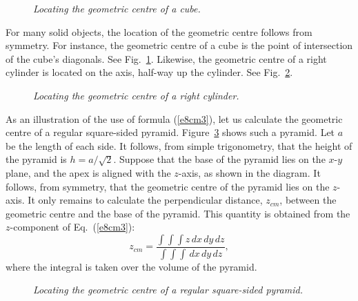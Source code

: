 \begin{figure}[h]
\epsfysize=1.5in
\centerline{}
\caption{\em Locating the geometric centre of a cube.}\label{f73}  
\end{figure}

For many solid objects, the location of the geometric centre follows from symmetry.
For instance, the geometric centre of a 
cube is the point of intersection of the cube's diagonals. See Fig.~\ref{f73}. Likewise,
the geometric centre of a right cylinder is located on the axis, half-way up the
cylinder. See Fig.~\ref{f74}.

\begin{figure}[h]
\epsfysize=2in
\centerline{}
\caption{\em Locating the geometric centre of a right cylinder.}\label{f74}  
\end{figure}

As an illustration of the use of formula (\ref{e8cm3}), let us calculate
the geometric centre of a regular square-sided pyramid. Figure~\ref{f75} shows such a
pyramid. Let $a$ be the length of each side. It follows, from simple
trigonometry,  that the height of
the pyramid is $h=a/\sqrt{2}$. Suppose that the base of the pyramid lies on the $x$-$y$ plane,
and  the apex is aligned with the $z$-axis, as shown in the diagram. 
It follows, from symmetry, that the geometric centre of the pyramid lies on the $z$-axis.
It only remains to calculate the perpendicular distance, $z_{cm}$, between the geometric
centre and the base of the pyramid. This quantity is obtained from the $z$-component
of Eq.~(\ref{e8cm3}):
\begin{equation}\label{e8py}
z_{cm} = \frac{\int\!\int\!\int z\,dx\,dy\,dz}{\int\!\int\!\int\,dx\,dy\,dz},
\end{equation}
where the integral is taken over the volume of the pyramid.

\begin{figure}
\epsfysize=2.5in
\centerline{}
\caption{\em Locating the geometric centre of a regular square-sided pyramid.}\label{f75}  
\end{figure}

